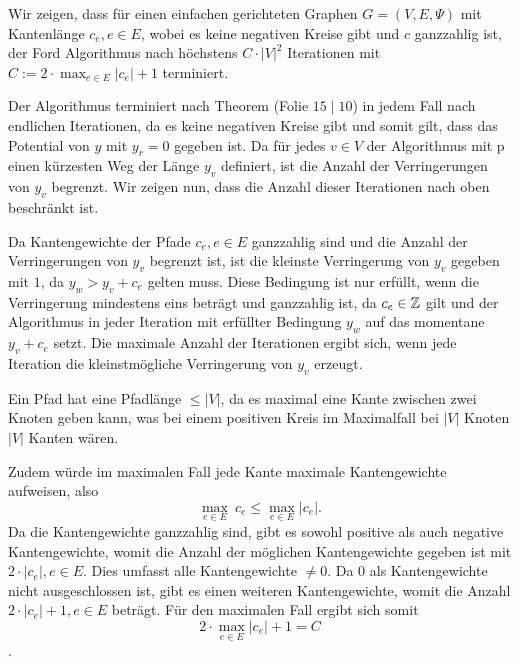 \documentclass{scrartcl} %
\begin{document}
    \begin{aufgabe}
        Wir zeigen, dass für einen einfachen gerichteten Graphen $G=(V,E,\Psi)$ mit Kantenlänge $c_e, e \in E$, wobei es keine negativen Kreise gibt und $c$ ganzzahlig ist, der Ford Algorithmus nach höchstens $C \cdot |V|^2$ Iterationen mit $C:=2 \cdot \max_{e \in E}|c_e|+1$ terminiert.
        
        Der Algorithmus terminiert nach Theorem (Folie \href{https://isis.tu-berlin.de/pluginfile.php/3544388/mod_resource/content/2/Kapitel15.pdf}{$15\mid10$}) in jedem Fall nach endlichen Iterationen, da es keine negativen Kreise gibt und somit gilt, dass das Potential von $y$ mit $y_r = 0$ gegeben ist. Da für jedes $v \in V$ der Algorithmus mit p einen kürzesten Weg der Länge $y_v$ definiert, ist die Anzahl der Verringerungen von $y_v$ begrenzt. Wir zeigen nun, dass die Anzahl dieser Iterationen nach oben beschränkt ist.
        
        Da Kantengewichte der Pfade $c_e, e \in E$ ganzzahlig sind und die Anzahl der Verringerungen von $y_v$ begrenzt ist, ist die kleinste Verringerung von $y_v$ gegeben mit $1$, da $y_w > y_v +c_e$ gelten muss. Diese Bedingung ist nur erfüllt, wenn die Verringerung mindestens eins beträgt und ganzzahlig ist, da $c_e \in \mathbb{\operatorname{\mathbb Z}}$ gilt und der Algorithmus in jeder Iteration mit erfüllter Bedingung $y_w$ auf das momentane $y_v + c_e$ setzt. Die maximale Anzahl der Iterationen ergibt sich, wenn jede Iteration die kleinstmögliche Verringerung von $y_v$ erzeugt. 
        
        Ein Pfad hat eine Pfadlänge $\leq |V|$, da es maximal eine Kante zwischen zwei Knoten geben kann, was bei einem positiven Kreis im Maximalfall bei $|V|$ Knoten $|V|$ Kanten wären. %
        
        Zudem würde im maximalen Fall jede Kante maximale Kantengewichte aufweisen, also $$\underset{e \in E}{\max} \ c_e \leq \underset{e \in E}{\max}|c_e|. $$ Da die Kantengewichte ganzzahlig sind, gibt es sowohl positive als auch negative Kantengewichte, womit die Anzahl der möglichen Kantengewichte gegeben ist mit $2 \cdot |c_e| , e \in E$. Dies umfasst alle Kantengewichte $\neq 0$. Da $0$ als Kantengewichte nicht ausgeschlossen ist, gibt es einen weiteren Kantengewichte, womit die Anzahl $2 \cdot |c_e| +1, e \in E$ beträgt. Für den maximalen Fall ergibt sich somit $$2\cdot \underset{e \in E}{\max}|c_e|+1 = C$$.
        

\end{aufgabe}
\end{document}
